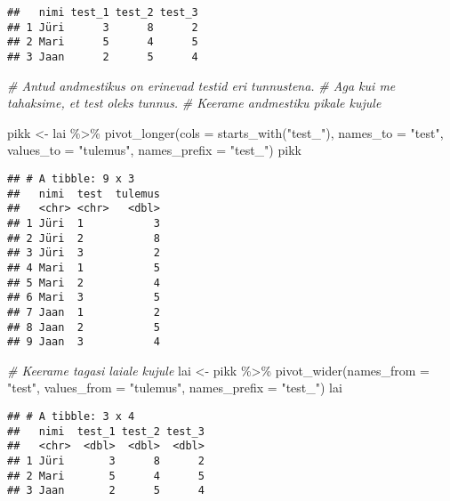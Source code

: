\documentclass[
]{book}
\newenvironment{Shaded}{\begin{snugshade}}{\end{snugshade}}
\newcommand{\AttributeTok}[1]{\textcolor[rgb]{0.77,0.63,0.00}{#1}}
\newcommand{\CommentTok}[1]{\textcolor[rgb]{0.56,0.35,0.01}{\textit{#1}}}
\newcommand{\FunctionTok}[1]{\textcolor[rgb]{0.00,0.00,0.00}{#1}}
\newcommand{\NormalTok}[1]{#1}
\newcommand{\OtherTok}[1]{\textcolor[rgb]{0.56,0.35,0.01}{#1}}
\newcommand{\SpecialCharTok}[1]{\textcolor[rgb]{0.00,0.00,0.00}{#1}}
\newcommand{\StringTok}[1]{\textcolor[rgb]{0.31,0.60,0.02}{#1}}
\begin{document}
\begin{verbatim}
##   nimi test_1 test_2 test_3
## 1 Jüri      3      8      2
## 2 Mari      5      4      5
## 3 Jaan      2      5      4
\end{verbatim}

\begin{Shaded}
\begin{Highlighting}[]
\CommentTok{\# Antud andmestikus on erinevad testid eri tunnustena. }
\CommentTok{\# Aga kui me tahaksime, et test oleks tunnus. }
\CommentTok{\# Keerame andmestiku pikale kujule}

\NormalTok{pikk }\OtherTok{\textless{}{-}}\NormalTok{ lai }\SpecialCharTok{\%\textgreater{}\%}
  \FunctionTok{pivot\_longer}\NormalTok{(}\AttributeTok{cols =} \FunctionTok{starts\_with}\NormalTok{(}\StringTok{"test\_"}\NormalTok{), }
               \AttributeTok{names\_to =} \StringTok{"test"}\NormalTok{, }
               \AttributeTok{values\_to =} \StringTok{"tulemus"}\NormalTok{,}
               \AttributeTok{names\_prefix =} \StringTok{"test\_"}\NormalTok{)}
\NormalTok{pikk}
\end{Highlighting}
\end{Shaded}

\begin{verbatim}
## # A tibble: 9 x 3
##   nimi  test  tulemus
##   <chr> <chr>   <dbl>
## 1 Jüri  1           3
## 2 Jüri  2           8
## 3 Jüri  3           2
## 4 Mari  1           5
## 5 Mari  2           4
## 6 Mari  3           5
## 7 Jaan  1           2
## 8 Jaan  2           5
## 9 Jaan  3           4
\end{verbatim}

\begin{Shaded}
\begin{Highlighting}[]
\CommentTok{\# Keerame tagasi laiale kujule}
\NormalTok{lai }\OtherTok{\textless{}{-}}\NormalTok{ pikk }\SpecialCharTok{\%\textgreater{}\%} 
  \FunctionTok{pivot\_wider}\NormalTok{(}\AttributeTok{names\_from =} \StringTok{"test"}\NormalTok{, }\AttributeTok{values\_from =} \StringTok{"tulemus"}\NormalTok{, }\AttributeTok{names\_prefix =} \StringTok{"test\_"}\NormalTok{)}
\NormalTok{lai}
\end{Highlighting}
\end{Shaded}

\begin{verbatim}
## # A tibble: 3 x 4
##   nimi  test_1 test_2 test_3
##   <chr>  <dbl>  <dbl>  <dbl>
## 1 Jüri       3      8      2
## 2 Mari       5      4      5
## 3 Jaan       2      5      4
\end{verbatim}
\end{document}
